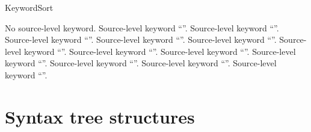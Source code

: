\subsubsection{}
\label{sec:ifc:KeywordSort}


\begin{SortEnum}{KeywordSort}
\end{SortEnum}

 No source-level keyword.
 Source-level keyword ``''.
 Source-level keyword ``''.
 Source-level keyword ``''.
 Source-level keyword ``''.
 Source-level keyword ``''.
 Source-level keyword ``''.
 Source-level keyword ``''.
 Source-level keyword ``''.
 Source-level keyword ``''.
 Source-level keyword ``''.
 Source-level keyword ``''.
 Source-level keyword ``''.

\section{Syntax tree structures}
\label{sec:ifc:SyntaxSort-structures}

\subsection{}
\label{sec:ifc:SyntaxSort:VendorExtension}


\subsection{}
\label{sec:ifc:SyntaxSort:SimpleTypeSpecifier}

